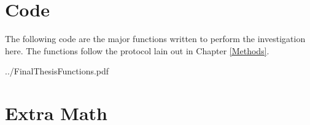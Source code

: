 \chapter{Code}
\label{AppendixA}
The following code are the major functions written to perform the investigation here.  The functions follow the protocol lain out in Chapter \ref{Methods}.  



    {../FinalThesisFunctions.pdf}
    
\chapter{Extra Math}

